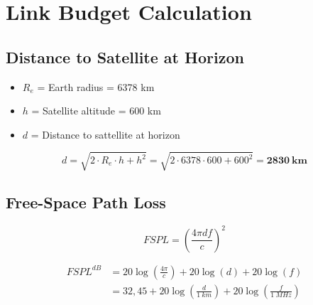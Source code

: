 %
%
%
%
%

%
%
%
%
%
%

\chapter{Link Budget Calculation} \label{anx:link-budget}

\section{Distance to Satellite at Horizon}

\begin{itemize}
    \item $R_{e}$ = Earth radius = 6378 km
    \item $h$ = Satellite altitude = 600 km
    \item $d$ = Distance to sattellite at horizon
\end{itemize}

\begin{equation}
d = \sqrt{2\cdot R_{e}\cdot h + h^{2}} = \sqrt{2\cdot 6378\cdot 600 + 600^{2}} = \mathbf{2830\ km}
\end{equation}





\section{Free-Space Path Loss}

\begin{equation}
FSPL = \left( \frac{4\pi d f}{c} \right)^{2}
\end{equation}

\begin{equation}
    \begin{split}
        FSPL^{dB} & = 20\log\left(\frac{4\pi}{c}\right) + 20\log\left(d\right) + 20\log\left(f\right) \\
                  & = 32,45 + 20\log\left(\frac{d}{1\ km}\right) + 20\log\left(\frac{f}{1\ MHz}\right) \\
    \end{split}
\end{equation}

